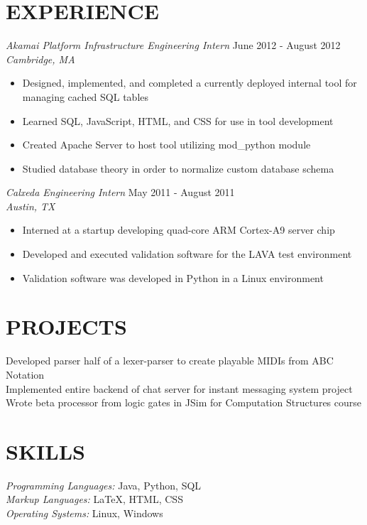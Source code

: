 \documentclass[margin]{res}
\begin{document}
\begin{resume}
\section{EXPERIENCE} {\sl Akamai Platform Infrastructure Engineering Intern} \hfill June 2012 -  August 2012 \\
                    {\sl Cambridge, MA}
                 \begin{itemize}  \itemsep -2pt %
                         \item  Designed, implemented, and completed a currently deployed internal tool for managing cached SQL tables
                         \item Learned SQL, JavaScript, HTML, and CSS for use in tool development
                         \item Created Apache Server to host tool utilizing mod\_python module 
                         \item Studied database theory in order to normalize custom database schema
                \end{itemize}

                {\sl Calxeda Engineering Intern} \hfill            May 2011 - August 2011 \\
                {\sl Austin, TX}
                 \begin{itemize}  \itemsep -2pt %
                          \item  Interned at a startup developing quad-core ARM Cortex-A9 server chip
                          \item Developed and executed validation software for the LAVA test environment
                          \item Validation software was developed in Python in a Linux environment
                 \end{itemize} 

\section{PROJECTS}Developed parser half of a lexer-parser to create playable MIDIs from ABC Notation \\
                Implemented entire backend of chat server for instant messaging system project \\
                Wrote beta processor from logic gates in JSim for Computation Structures course
 
\section{SKILLS} {\sl Programming Languages:} Java, Python, SQL \\
                 {\sl Markup Languages:} \LaTeX, HTML, CSS \\
                 {\sl Operating Systems:} Linux, Windows
 

\end{resume}
\end{document}
